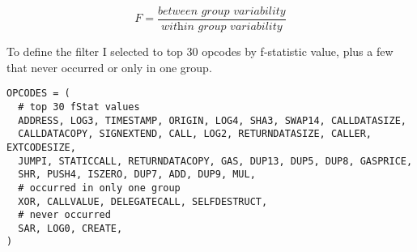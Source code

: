 \documentclass[../main.tex]{subfiles}
\begin{document}
\begin{equation}
  F = \dfrac{\textit{between group variability}}{\textit{within group variability}}
  \label{eq:ftest}
\end{equation}

To define the  filter I selected to top 30 opcodes by f-statistic value, plus a few that never occurred or only in one group.

\begin{lstlisting}[style=pymd]
OPCODES = (
  # top 30 fStat values
  ADDRESS, LOG3, TIMESTAMP, ORIGIN, LOG4, SHA3, SWAP14, CALLDATASIZE,
  CALLDATACOPY, SIGNEXTEND, CALL, LOG2, RETURNDATASIZE, CALLER, EXTCODESIZE,
  JUMPI, STATICCALL, RETURNDATACOPY, GAS, DUP13, DUP5, DUP8, GASPRICE,
  SHR, PUSH4, ISZERO, DUP7, ADD, DUP9, MUL,
  # occurred in only one group
  XOR, CALLVALUE, DELEGATECALL, SELFDESTRUCT,
  # never occurred
  SAR, LOG0, CREATE,
)
\end{lstlisting}
\end{document}
